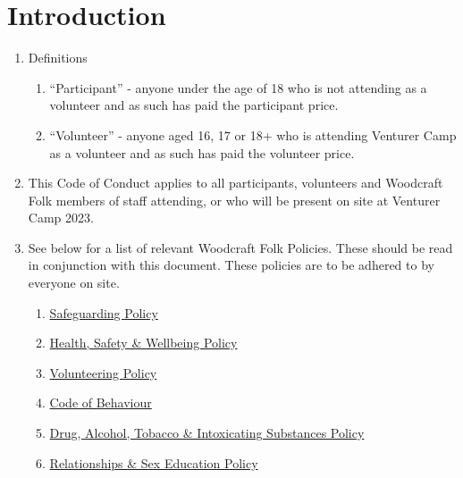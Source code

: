 \documentclass[a4paper, 11pt]{report}
\def\enumMarginIndentOne{4em}
\begin{document}
    \tableofcontents
    \chapter{Introduction}
    \begin{enumerate}
        \item Definitions
        \begin{enumerate}[leftmargin=\enumMarginIndentOne]
            \item ``Participant'' - anyone under the age of 18 who is not attending as a volunteer and as such has paid the participant price.
            \item ``Volunteer'' - anyone aged 16, 17 or 18+ who is attending Venturer Camp as a volunteer and as such has paid the volunteer price.
        \end{enumerate}
        \item This Code of Conduct applies to all participants, volunteers and Woodcraft Folk members of staff attending, or who will be present on site at Venturer Camp 2023.
        \item See below for a list of relevant Woodcraft Folk Policies. These should be read in conjunction with this document. These policies are to be adhered to by everyone on site.
        \begin{enumerate}[leftmargin=\enumMarginIndentOne]
            \item \href{https://woodcraft.org.uk/resources/safeguarding-policy/}{Safeguarding Policy}
            \item \href{https://woodcraft.org.uk/resources/health-safety-policy/}{Health, Safety \& Wellbeing Policy}
            \item \href{https://woodcraft.org.uk/resources/volunteering-policy/}{Volunteering Policy}
            \item \href{https://woodcraft.org.uk/resources/code-of-behaviour/}{Code of Behaviour}
            \item \href{https://woodcraft.org.uk/resources/drug-alcohol-policy/}{Drug, Alcohol, Tobacco \& Intoxicating Substances Policy}
            \item \href{https://woodcraft.org.uk/resources/relationship-sex-education-policy/}{Relationships \& Sex Education Policy}
        \end{enumerate}
    \end{enumerate}
\end{document}
